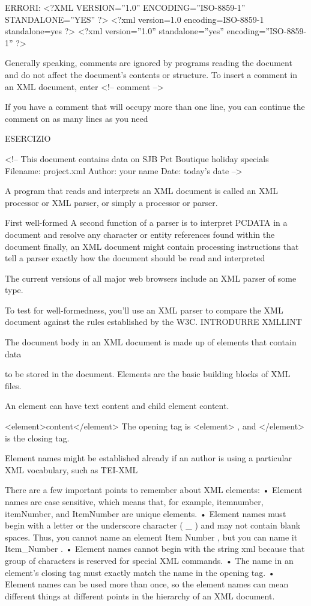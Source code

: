 ERRORI:
<?XML VERSION=”1.0” ENCODING=”ISO-8859-1” STANDALONE=”YES” ?>
<?xml version=1.0 encoding=ISO-8859-1 standalone=yes ?>
<?xml version=”1.0” standalone=”yes” encoding=”ISO-8859-1” ?>

Generally speaking, comments are ignored by programs reading the document and
do not affect the document’s contents or structure.
To insert a comment in an XML document, enter
<!-- comment -->

If you have a comment that will occupy more than one line, you can
continue the ­comment on as many lines as you need


ESERCIZIO

<!--
This document contains data on SJB Pet Boutique
holiday specials
Filename: project.xml
Author:
your name
Date:
today's date
-->


A program that reads and interprets an XML document is called an XML processor or XML parser, or simply a processor or parser.

First well-formed
A second function of a parser is to interpret PCDATA in a document and resolve any character or
entity references found within the document
finally, an XML document might contain
processing instructions that tell a parser exactly how the document should be read and
interpreted

The current versions of all major web browsers include an XML parser of some type.

To test for well-formedness, you’ll use an XML parser to compare the XML document against the
rules established by the W3C.
INTRODURRE XMLLINT


The document body in an XML document is made up of elements that contain data

to be stored in the document. Elements are the basic building blocks of XML files.

An ­element can have text content and child element content.

<element>content</element>
The opening tag is <element> , and </element> is the closing
tag.

Element names might be established already if an author is using a particular XML
vocabulary, such as TEI-XML


There are a few important points to remember about XML elements:
• Element names are case sensitive, which means that, for example, itemnumber,
itemNumber, and ItemNumber are unique elements.
• Element names must begin with a letter or the underscore character ( _ ) and may not
contain blank spaces. Thus, you cannot name an element Item Number , but you can
name it Item_Number .
• Element names cannot begin with the string xml because that group of ­characters is
reserved for special XML commands.
• The name in an element’s closing tag must exactly match the name in the ­opening tag.
• Element names can be used more than once, so the element names can mean
different things at different points in the hierarchy of an XML document.

